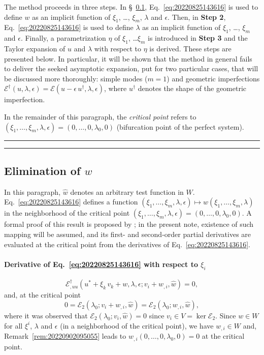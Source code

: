 \documentclass[12pt, final]{scrartcl}
\theoremstyle{definition}
\newcommand{\E}{\mathcal E}
\newcommand{\EE}{\mathcal E ^ \dagger}
\newcommand{\uu}{u^\dagger}
\begin{document}
The method proceeds in three steps. In \S~\ref{sec:20221020140204}, Eq.~\eqref{eq:20220825143616} is used to define $w$
as an implicit function of $\xi_1$, \dots, $\xi_m$, $\lambda$ and \(\epsilon\). Then, in \textbf{Step 2},
Eq.~\eqref{eq:20220825143616} is used to define $\lambda$ as an implicit function of $\xi_1$, \dots, $\xi_m$ and
\(\epsilon\). Finally, a parametrization $\eta$ of $\xi_1$, \dots $\xi_m$ is introduced in \textbf{Step 3} and the
Taylor expansion of $u$ and $\lambda$ with respect to $\eta$ is derived. These steps are presented below. In particular,
it will be shown that the method in general fails to deliver the seeked asymptotic expansion, put for two particular
cases, that will be discussed more thoroughly: simple modes (\(m = 1\)) and geometric imperfections
\(\EE(u, \lambda, \epsilon) = \E(u - \epsilon \, \uu, \lambda, \epsilon)\), where \(\uu\) denotes the shape of the
geometric imperfection.

In the remainder of this paragraph, the \emph{critical point} refers to
\((\xi_1, \ldots, \xi_m, \lambda, \epsilon) = (0, \ldots, 0, \lambda_0, 0)\) (bifurcation point of the perfect system).

\hrule



\hrule

\subsection{Elimination of \(w\)}
\label{sec:20221020140204}

In this paragraph, $\hat{w}$ denotes an arbitrary test function in $W$. Eq.~\eqref{eq:20220825143616} defines a function
$(\xi_1, \ldots, \xi_m, \lambda, \epsilon) \mapsto w(\xi_1, \ldots, \xi_m, \lambda)$ in the neighborhood of the critical point
$(\xi_1, \ldots, \xi_m, \lambda, \epsilon) = (0, \ldots, 0, \lambda_0, 0)$. A formal proof of this result is proposed by \textcite{poti1987}; in the
present note, existence of such mapping will be assumed, and its first- and second-order partial derivatives are
evaluated at the critical point from the derivatives of Eq.~\eqref{eq:20220825143616}.

\paragraph{Derivative of Eq.~\eqref{eq:20220825143616} with respect to \(\xi_i\)}
\begin{equation}
  \label{eq:20220826140926}
  \EE_{,uu}(u^\ast + \xi_k \, v_k + w, \lambda, \epsilon; v_i + w_{,i}, \hat{w}) = 0,
\end{equation}
and, at the critical point
\begin{equation}
  \label{eq:20220825150219}
  0 = \E_2(\lambda_0; v_i + w_{,i}, \hat{w}) = \E_2(\lambda_0; w_{,i}, \hat{w}),
\end{equation}
where it was observed that \(\E_2(\lambda_0; v_i, \hat{w}) = 0\) since \(v_i \in V = \ker \E_2\). Since $w \in W$ for all
$\xi^i$, $\lambda$ and \(\epsilon\) (in a neighborhood of the critical point), we have $w_{,i} \in W$ and,
Remark~\ref{rem:20220902095055} leads to $w_{,i}(0, \ldots, 0, \lambda_0, 0) = 0$ at the critical point.
\end{document}
